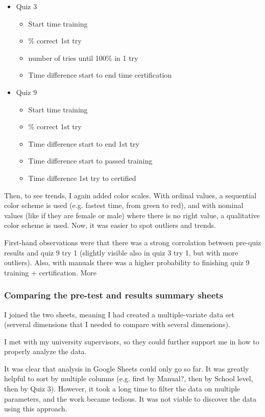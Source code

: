 \begin{itemize}
  \item Quiz 3
  \begin{itemize}
    \item Start time training
    \item \% correct 1st try
    \item number of tries until 100\% in 1 try
    \item Time difference start to end time certification
  \end{itemize}
  \item Quiz 9
  \begin{itemize}
    \item Start time training
    \item \% correct 1st try
    \item Time difference start to end 1st try
    \item Time difference start to passed training
    \item Time difference 1st try to certified
  \end{itemize}
\end{itemize}

Then, to see trends, I again added color scales. With ordinal values, a sequential color scheme is used (e.g. fastest time, from green to red), and with nominal values (like if they are female or male) where there is no right value, a qualitative color scheme is used. Now, it was easier to spot outliers and trends.

First-hand observations were that there was a strong corrolation between pre-quiz results and quiz 9 try 1 (slightly visible also in quiz 3 try 1, but with more outliers). Also, with manuals there was a higher probability to finishing quiz 9 training + certification. More

\subsubsection{Comparing the pre-test and results summary sheets}

I joined the two sheets, meaning I had created a multiple-variate data set (serveral dimensions that I needed to compare with several dimensions).

I met with my university supervisors, so they could further support me in how to properly analyze the data.

It was clear that analysis in Google Sheets could only go so far. It was greatly helpful to sort by multiple columns (e.g. first by Manual?, then by School level, then by Quiz 3). However, it took a long time to filter the data on multiple parameters, and the work became tedious. It was not viable to discover the data using this approach.

